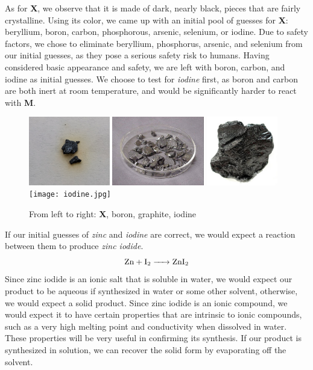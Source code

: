\documentclass[titlepage]{article}
\begin{document}
As for \textbf{X}, we observe that it is made of dark, nearly black, pieces that are fairly crystalline. Using its color, we came up with an initial pool of guesses for \textbf{X}: beryllium, boron, carbon, phosphorous, arsenic, selenium, or iodine. Due to safety factors, we chose to eliminate beryllium, phosphorus, arsenic, and selenium from our initial guesses, as they pose a serious safety risk to humans. Having considered basic appearance and safety, we are left with boron, carbon, and iodine as initial guesses. We choose to test for \emph{iodine} first, as boron and carbon are both inert at room temperature, and would be significantly harder to react with \textbf{M}.
\begin{figure}[h]
    \centering
    \includegraphics[height=3cm]{unknown_X.jpg}
    \includegraphics[height=3cm]{boron.jpg}
    \includegraphics[height=3cm]{graphite.jpg}
    \texttt{[image: iodine.jpg]}
    \caption{From left to right: \textbf{X}, boron, graphite, iodine}
    \label{fig:x_comparison}
\end{figure}

If our initial guesses of \emph{zinc} and \emph{iodine} are correct, we would expect a reaction between them to produce \emph{zinc iodide}. 
\begin{displaymath}
    \ce{Zn + I2 -> ZnI2}
\end{displaymath}
Since zinc iodide is an ionic salt that is soluble in water, we would expect our product to be aqueous if synthesized in water or some other solvent, otherwise, we would expect a solid product. Since zinc iodide is an ionic compound, we would expect it to have certain properties that are intrinsic to ionic compounds, such as a very high melting point and conductivity when dissolved in water. These properties will be very useful in confirming its synthesis. If our product is synthesized in solution, we can recover the solid form by evaporating off the solvent.
\bigskip
\end{document}
